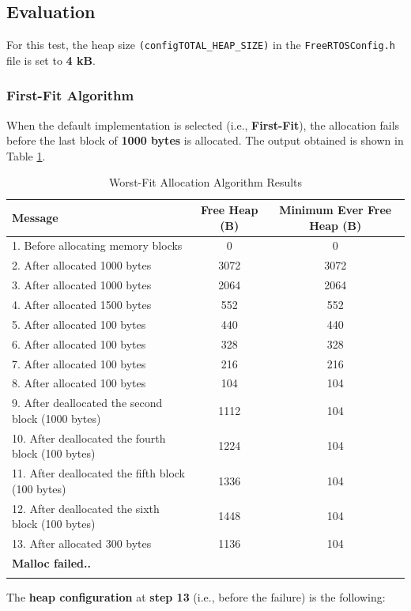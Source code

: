 \subsection{Evaluation}
\label{subsec: Evaluation}
For this test, the heap size \texttt{(configTOTAL\_HEAP\_SIZE)} in the \texttt{FreeRTOSConfig.h} file is set to \textbf{4 kB}.

\subsubsection{First-Fit Algorithm}
When the default implementation is selected (i.e., \textbf{First-Fit}), the allocation fails before the last block of \textbf{1000 bytes} is allocated. The output obtained is shown in Table \ref{tab:firstfit}.

\begin{longtable}{|l|c|c|}
    \hline
    \textbf{Message} & \textbf{Free Heap (B)} & \textbf{Minimum Ever Free Heap (B)} \\
    \hline
    1. Before allocating memory blocks & 0 & 0 \\
    2. After allocated 1000 bytes & 3072 & 3072 \\
    3. After allocated 1000 bytes & 2064 & 2064 \\
    4. After allocated 1500 bytes & 552 & 552 \\
    5. After allocated 100 bytes & 440 & 440 \\
    6. After allocated 100 bytes & 328 & 328 \\
    7. After allocated 100 bytes & 216 & 216 \\
    8. After allocated 100 bytes & 104 & 104 \\
    9. After deallocated the second block (1000 bytes) & 1112 & 104 \\
    10. After deallocated the fourth block (100 bytes) & 1224 & 104 \\
    11. After deallocated the fifth block (100 bytes) & 1336 & 104 \\
    12. After deallocated the sixth block (100 bytes) & 1448 & 104 \\
    13. After allocated 300 bytes & 1136 & 104 \\
    \hline
    \textbf{Malloc failed..} & & \\
    \hline
    \caption{Worst-Fit Allocation Algorithm Results}
    \label{tab:firstfit}
\end{longtable}

The \textbf{heap configuration} at \textbf{step 13} (i.e., before the failure) is the following:

